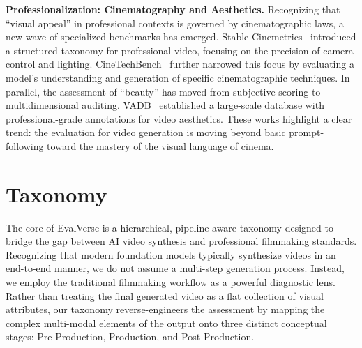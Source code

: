 \documentclass{llmxive}
\begin{document}
\noindent
\textbf{Professionalization: Cinematography and Aesthetics.} Recognizing that ``visual appeal'' in professional contexts is governed by cinematographic laws, a new wave of specialized benchmarks has emerged. Stable Cinemetrics~\cite{stable_cinemetrics} introduced a structured taxonomy for professional video, focusing on the precision of camera control and lighting. CineTechBench~\cite{cinetechbench} further narrowed this focus by evaluating a model's understanding and generation of specific cinematographic techniques. In parallel, the assessment of ``beauty'' has moved from subjective scoring to multidimensional auditing. VADB~\cite{vadb} established a large-scale database with professional-grade annotations for video aesthetics. These works highlight a clear trend: the evaluation for video generation is moving beyond basic prompt-following toward the mastery of the visual language of cinema.




\section{Taxonomy}

The core of EvalVerse is a hierarchical, pipeline-aware taxonomy designed to bridge the gap between AI video synthesis and professional filmmaking standards. Recognizing that modern foundation models typically synthesize videos in an end-to-end manner, we do not assume a multi-step generation process. Instead, we employ the traditional filmmaking workflow as a powerful diagnostic lens. Rather than treating the final generated video as a flat collection of visual attributes, our taxonomy reverse-engineers the assessment by mapping the complex multi-modal elements of the output onto three distinct conceptual stages: Pre-Production, Production, and Post-Production.
\end{document}

